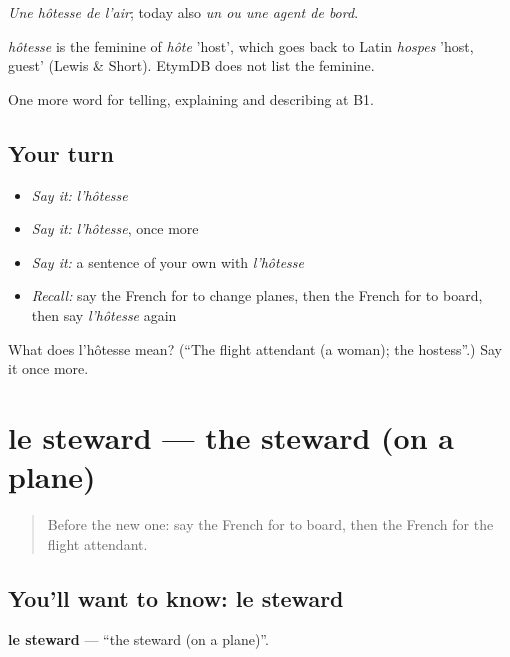 \emph{Une hôtesse de l'air}; today also \emph{un ou une agent de bord}.

\begin{cousinweb}
\emph{hôtesse} is the feminine of \emph{hôte} 'host', which goes back to Latin \emph{hospes} 'host, guest' (Lewis \& Short). EtymDB does not list the feminine.
\end{cousinweb}

\begin{grammarlens}[title={What you've built}]
One more word for telling, explaining and describing at B1.
\end{grammarlens}

\subsection*{Your turn}
\begin{itemize}
\raggedright
  \item \emph{Say it:} \emph{l'hôtesse}
  \item \emph{Say it:} \emph{l'hôtesse}, once more
  \item \emph{Say it:} a sentence of your own with \emph{l'hôtesse}
  \item \emph{Recall:} say the French for to change planes, then the French for to board, then say \emph{l'hôtesse} again
\end{itemize}

\begin{tcolorbox}[breakable,colback=teal!4,colframe=teal!35!black,title={Before you move on}]
What does l'hôtesse mean? (\textquotedblleft{}The flight attendant (a woman); the hostess\textquotedblright{}.) Say it once more.
\end{tcolorbox}
\section[le steward]{le steward — the steward (on a plane)}

\label{lesson:FR-C418-steward}



\begin{quote}
Before the new one: say the French for to board, then the French for the flight attendant.
\end{quote}

\subsection*{You'll want to know: le steward}
\textbf{le steward} — \textquotedblleft{}the steward (on a plane)\textquotedblright{}.

